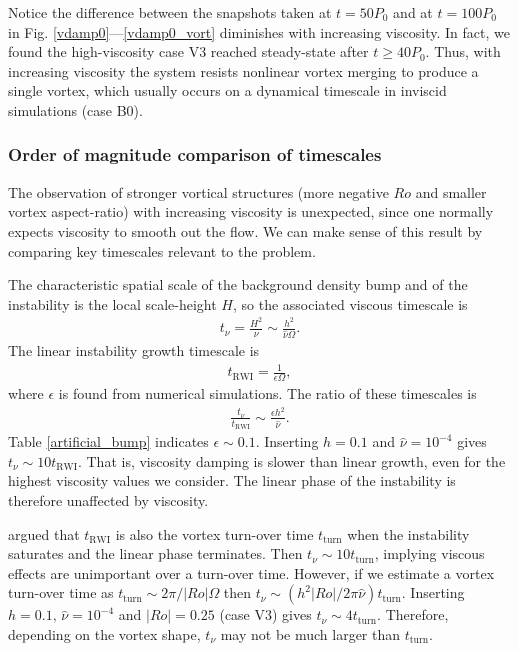 Notice the difference between the snapshots taken at $t=50P_0$ and at
$t=100P_0$ in Fig. \ref{vdamp0}---\ref{vdamp0_vort}
diminishes with increasing viscosity. In fact, we found the
high-viscosity case V3 reached steady-state after $t\geq40P_0$. Thus,
with increasing viscosity the system resists nonlinear vortex merging
to produce a single vortex, which usually occurs on a dynamical
timescale in inviscid simulations (case B0). 



\subsubsection{Order of magnitude comparison of timescales}
The observation of stronger vortical structures (more negative $Ro$
and smaller vortex aspect-ratio) with increasing
viscosity is unexpected, since one normally expects viscosity to
smooth out the flow. We can make sense of this result by comparing key
timescales relevant to the problem. 

The characteristic spatial scale of the background density bump and of
the instability is the local scale-height $H$, so the associated
viscous timescale is    
\begin{align}
  t_\nu = \frac{H^2}{\nu}\sim \frac{h^2}{\hat{\nu}\Omega}. 
\end{align}
The linear instability growth timescale is
\begin{align}
  t_\mathrm{RWI} = \frac{1}{\epsilon \Omega},
\end{align}
where $\epsilon$ is found from numerical simulations. 
The ratio of these timescales is
\begin{align}
  \frac{t_\nu}{t_\mathrm{RWI}} \sim \frac{\epsilon h^2}{\hat{\nu}}.
\end{align}
Table \ref{artificial_bump} indicates $\epsilon \sim 0.1$. 
Inserting $h=0.1$ and $\hat{\nu}=10^{-4}$ gives $t_\nu \sim 10
t_\mathrm{RWI}$. That is, viscosity damping is slower than linear
growth, even for the highest viscosity values we consider. The linear
phase of the instability is therefore unaffected by viscosity. 

\cite{meheut13} argued that $t_\mathrm{RWI}$ is also the vortex
turn-over time $t_\mathrm{turn}$ when the instability saturates and
the linear phase terminates. Then 
$t_\nu\sim 10 t_\mathrm{turn}$, implying viscous effects 
are unimportant over a turn-over time. 
However, if we estimate a vortex turn-over time as $t_\mathrm{turn}
\sim 2\pi/|Ro|\Omega$ then $t_\nu\sim (h^2|Ro|/2\pi\hat{\nu})t_\mathrm{turn}$.  
Inserting $h=0.1,\,\hat{\nu}=10^{-4}$ and $|Ro|=0.25$ (case V3) gives 
$t_\nu \sim 4t_\mathrm{turn}$. Therefore, depending on the vortex shape, 
$t_\nu$ may not be much larger than $t_\mathrm{turn}$. 

